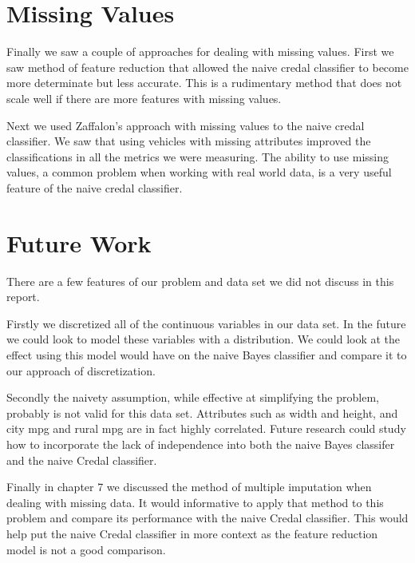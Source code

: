 \section{Missing Values}
Finally we saw a couple of approaches for dealing with missing values.
First we saw method of feature reduction that allowed the naive credal classifier to become more determinate but less accurate.
This is a rudimentary method that does not scale well if there are more features with missing values.

Next we used Zaffalon's approach with missing values to the naive credal classifier.
We saw that using vehicles with missing attributes improved the classifications in all the metrics we were measuring.
The ability to use missing values, a common problem when working with real world data, is a very useful feature of the naive credal classifier.

\section{Future Work}

There are a few features of our problem and data set we did not discuss in this report.

Firstly we discretized all of the continuous variables in our data set.
In the future we could look to model these variables with a distribution.
We could look at the effect using this model would have on the naive Bayes classifier and compare it to our approach of discretization.

Secondly the naivety assumption, while effective at simplifying the problem, probably is not valid for this data set.
Attributes such as width and height, and city mpg and rural mpg are in fact highly correlated.
Future research could study how to incorporate the lack of independence into both the naive Bayes classifer and the naive Credal classifier.

Finally in chapter 7 we discussed the method of multiple imputation when dealing with missing data.
It would informative to apply that method to this problem and compare its performance with the naive Credal classifier.
This would help put the naive Credal classifier in more context as the feature reduction model is not a good comparison.
